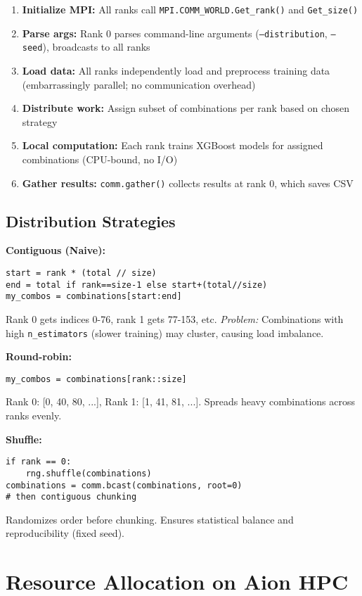 \documentclass[sigplan,screen]{acmart}
\begin{document}
\begin{enumerate}
\item \textbf{Initialize MPI:} All ranks call
      \texttt{MPI.COMM\_WORLD.Get\_rank()} and \texttt{Get\_size()}
\item \textbf{Parse args:} Rank 0 parses command-line arguments
      (\texttt{--distribution}, \texttt{--seed}), broadcasts to all ranks
\item \textbf{Load data:} All ranks independently load and preprocess
      training data (embarrassingly parallel; no communication overhead)
\item \textbf{Distribute work:} Assign subset of combinations per rank
      based on chosen strategy
\item \textbf{Local computation:} Each rank trains XGBoost models for
      assigned combinations (CPU-bound, no I/O)
\item \textbf{Gather results:} \texttt{comm.gather()} collects results at
      rank 0, which saves CSV
\end{enumerate}

\subsection{Distribution Strategies}

\textbf{Contiguous (Naive):}
\begin{verbatim}
start = rank * (total // size)
end = total if rank==size-1 else start+(total//size)
my_combos = combinations[start:end]
\end{verbatim}
Rank 0 gets indices 0-76, rank 1 gets 77-153, etc. \textit{Problem:}
Combinations with high \texttt{n\_estimators} (slower training) may
cluster, causing load imbalance.

\textbf{Round-robin:}
\begin{verbatim}
my_combos = combinations[rank::size]
\end{verbatim}
Rank 0: [0, 40, 80, ...], Rank 1: [1, 41, 81, ...]. Spreads heavy
combinations across ranks evenly.

\textbf{Shuffle:}
\begin{verbatim}
if rank == 0:
    rng.shuffle(combinations)
combinations = comm.bcast(combinations, root=0)
# then contiguous chunking
\end{verbatim}
Randomizes order before chunking. Ensures statistical balance and
reproducibility (fixed seed).

\section{Resource Allocation on Aion HPC}
\label{sec:resources}
\end{document}
